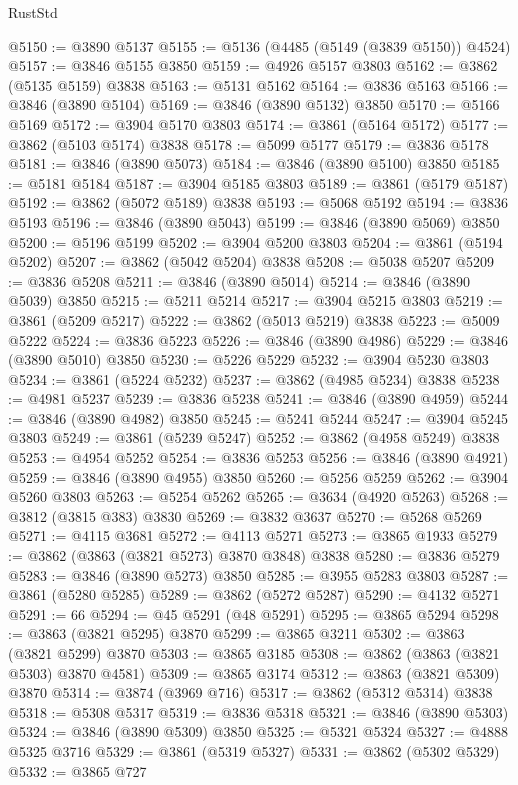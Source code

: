 \begin{lexlean}{RustStd}
\begin{coremodule}
@5150 := @3890 @5137
@5155 := @5136 (@4485 (@5149 (@3839 @5150)) @4524)
@5157 := @3846 @5155 @3850
@5159 := @4926 @5157 @3803
@5162 := @3862 (@5135 @5159) @3838
@5163 := @5131 @5162
@5164 := @3836 @5163
@5166 := @3846 (@3890 @5104)
@5169 := @3846 (@3890 @5132) @3850
@5170 := @5166 @5169
@5172 := @3904 @5170 @3803
@5174 := @3861 (@5164 @5172)
@5177 := @3862 (@5103 @5174) @3838
@5178 := @5099 @5177
@5179 := @3836 @5178
@5181 := @3846 (@3890 @5073)
@5184 := @3846 (@3890 @5100) @3850
@5185 := @5181 @5184
@5187 := @3904 @5185 @3803
@5189 := @3861 (@5179 @5187)
@5192 := @3862 (@5072 @5189) @3838
@5193 := @5068 @5192
@5194 := @3836 @5193
@5196 := @3846 (@3890 @5043)
@5199 := @3846 (@3890 @5069) @3850
@5200 := @5196 @5199
@5202 := @3904 @5200 @3803
@5204 := @3861 (@5194 @5202)
@5207 := @3862 (@5042 @5204) @3838
@5208 := @5038 @5207
@5209 := @3836 @5208
@5211 := @3846 (@3890 @5014)
@5214 := @3846 (@3890 @5039) @3850
@5215 := @5211 @5214
@5217 := @3904 @5215 @3803
@5219 := @3861 (@5209 @5217)
@5222 := @3862 (@5013 @5219) @3838
@5223 := @5009 @5222
@5224 := @3836 @5223
@5226 := @3846 (@3890 @4986)
@5229 := @3846 (@3890 @5010) @3850
@5230 := @5226 @5229
@5232 := @3904 @5230 @3803
@5234 := @3861 (@5224 @5232)
@5237 := @3862 (@4985 @5234) @3838
@5238 := @4981 @5237
@5239 := @3836 @5238
@5241 := @3846 (@3890 @4959)
@5244 := @3846 (@3890 @4982) @3850
@5245 := @5241 @5244
@5247 := @3904 @5245 @3803
@5249 := @3861 (@5239 @5247)
@5252 := @3862 (@4958 @5249) @3838
@5253 := @4954 @5252
@5254 := @3836 @5253
@5256 := @3846 (@3890 @4921)
@5259 := @3846 (@3890 @4955) @3850
@5260 := @5256 @5259
@5262 := @3904 @5260 @3803
@5263 := @5254 @5262
@5265 := @3634 (@4920 @5263)
@5268 := @3812 (@3815 @383) @3830
@5269 := @3832 @3637
@5270 := @5268 @5269
@5271 := @4115 @3681
@5272 := @4113 @5271
@5273 := @3865 @1933
@5279 := @3862 (@3863 (@3821 @5273) @3870 @3848) @3838
@5280 := @3836 @5279
@5283 := @3846 (@3890 @5273) @3850
@5285 := @3955 @5283 @3803
@5287 := @3861 (@5280 @5285)
@5289 := @3862 (@5272 @5287)
@5290 := @4132 @5271
@5291 := 66
@5294 := @45 @5291 (@48 @5291)
@5295 := @3865 @5294
@5298 := @3863 (@3821 @5295) @3870
@5299 := @3865 @3211
@5302 := @3863 (@3821 @5299) @3870
@5303 := @3865 @3185
@5308 := @3862 (@3863 (@3821 @5303) @3870 @4581)
@5309 := @3865 @3174
@5312 := @3863 (@3821 @5309) @3870
@5314 := @3874 (@3969 @716)
@5317 := @3862 (@5312 @5314) @3838
@5318 := @5308 @5317
@5319 := @3836 @5318
@5321 := @3846 (@3890 @5303)
@5324 := @3846 (@3890 @5309) @3850
@5325 := @5321 @5324
@5327 := @4888 @5325 @3716
@5329 := @3861 (@5319 @5327)
@5331 := @3862 (@5302 @5329)
@5332 := @3865 @727

\end{coremodule}
\end{lexlean}
